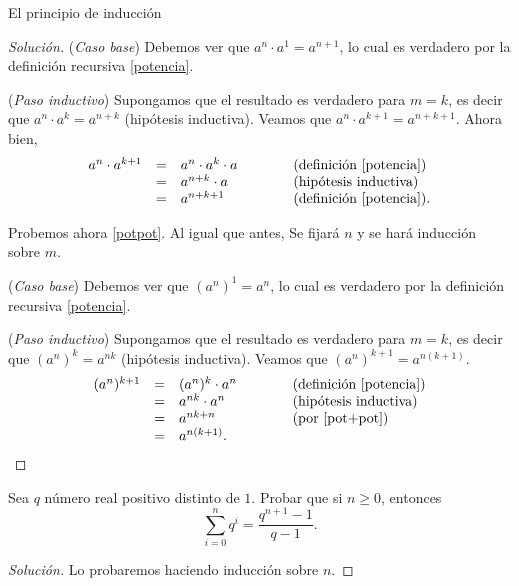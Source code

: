 \begin{section}{El principio de inducción}
\begin{proof}[Solución]
    \noindent(\textit{Caso  base}) Debemos ver que $a^{n} \cdot a^1 = a^{n+1}$, lo cual es verdadero por la definición recursiva \eqref{potencia}. 
    
    \noindent (\textit{Paso  inductivo}) Supongamos que el resultado es verdadero para $m=k$, es decir que $a^{n} \cdot a^k = a^{n+k}$ (hipótesis inductiva). Veamos que  $a^{n} \cdot a^{k+1} = a^{n+k+1}$. Ahora bien, 
    \begin{equation*}
        \begin{matrix*}[l]
            a^{n} \cdot a^{k+1} &=& a^{n} \cdot a^{k} \cdot a &\qquad  &\text{(definición \eqref{potencia})} \\
            &=& a^{n+k} \cdot a &\qquad &\text{(hipótesis inductiva)} \\
            &=& a^{n+k+1} &\qquad  &\text{(definición \eqref{potencia})}. 
        \end{matrix*}
    \end{equation*}
    
    Probemos ahora \ref{potpot}. Al igual que antes, Se fijará $n$ y se hará inducción sobre $m$.
    
    \noindent(\textit{Caso  base}) Debemos ver que $(a^n)^1 = a^n$, lo cual es verdadero por la definición recursiva \eqref{potencia}. 
    
    
    \noindent (\textit{Paso  inductivo}) Supongamos que el resultado es verdadero para $m=k$, es decir que  $(a^n)^k = a^{nk}$ (hipótesis inductiva). Veamos que  $(a^n)^{k+1} = a^{n(k+1)}$. 
    \begin{equation*}
        \begin{matrix*}[l]
        (a^n)^{k+1} &=& (a^n)^{k} \cdot a^n &\qquad  &\text{(definición \eqref{potencia})} \\
        &=& a^{nk} \cdot a^n &\qquad &\text{(hipótesis inductiva)} \\
        &=& a^{nk+n} &\qquad  &\text{(por \ref{pot+pot})}\\
        &=& a^{n(k+1)}. &\qquad  &
    \end{matrix*}
\end{equation*}
\end{proof}


\begin{ejemplo*} Sea $q$ número real positivo distinto de $1$. Probar  que si $n \ge 0$,  entonces
    \begin{equation*}
        \sum_{i=0}^n q^i = \frac{q^{n+1} -1}{q -1}.
    \end{equation*}
    \begin{proof}[Solución] Lo probaremos haciendo inducción sobre $n$.


\end{proof}
\end{ejemplo*}
\end{section}
